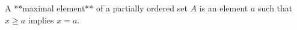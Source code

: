 A **maximal element** of a partially ordered set $A$ is an element $a$ such that $x \geq a$ implies $x = a$.
